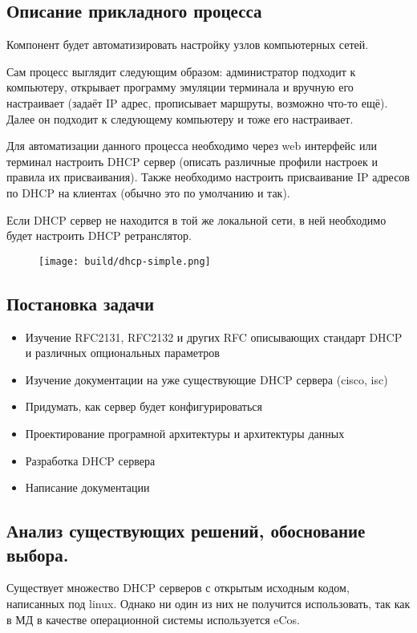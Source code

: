 \documentclass[12pt]{article}
\begin{document}
\subsection{Описание прикладного процесса}
Компонент будет автоматизировать настройку узлов компьютерных сетей.

Сам процесс выглядит следующим образом:
администратор подходит к компьютеру, открывает программу эмуляции терминала и вручную его настраивает (задаёт IP адрес, прописывает маршруты, возможно что-то ещё). Далее он подходит к следующему компьютеру и тоже его настраивает.

Для автоматизации данного процесса необходимо через web интерфейс или терминал настроить DHCP сервер (описать различные профили настроек и правила их присваивания). Также необходимо настроить присваивание IP адресов по DHCP на клиентах (обычно это по умолчанию и так).

Если DHCP сервер не находится в той же локальной сети, в ней необходимо будет настроить DHCP ретранслятор.

\begin{figure}[H]
    \texttt{[image: build/dhcp-simple.png]}
    \caption{}
\end{figure}


\subsection{Постановка задачи}

\begin{itemize}
    \item Изучение RFC2131, RFC2132 и других RFC описывающих стандарт DHCP и различных опциональных параметров
    \item Изучение документации на уже существующие DHCP сервера (cisco, isc)
    \item Придумать, как сервер будет конфигурироваться
    \item Проектирование програмной архитектуры и архитектуры данных
    \item Разработка DHCP сервера
    \item Написание документации
\end{itemize}

\subsection{Анализ существующих решений, обоснование выбора.}

Существует множество DHCP серверов с открытым исходным кодом, написанных под linux.
Однако ни один из них не получится использовать, так как в МД в качестве операционной системы используется eCos.
\end{document}
